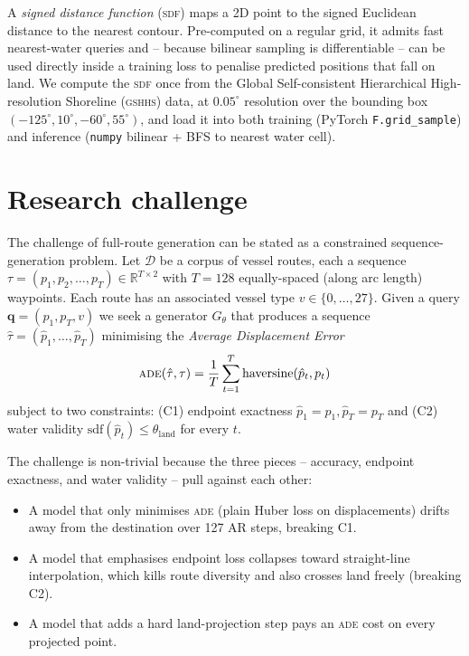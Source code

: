 \documentclass[11pt,a4paper]{article}
\newcommand{\ade}{\textsc{ade}}
\newcommand{\sdf}{\textsc{sdf}}
\newcommand{\code}[1]{\texttt{\small #1}}
\begin{document}
A \emph{signed distance function} (\sdf) maps a 2D point to the signed
Euclidean distance to the nearest contour.  Pre-computed on a regular
grid, it admits fast nearest-water queries and -- because bilinear
sampling is differentiable -- can be used directly inside a training
loss to penalise predicted positions that fall on land.  We compute the
\sdf{} once from the Global Self-consistent Hierarchical
High-resolution Shoreline (\textsc{gshhs}) data, at $0.05^\circ$
resolution over the bounding box $(-125^\circ, 10^\circ, -60^\circ,
55^\circ)$, and load it into both training (PyTorch
\code{F.grid\_sample}) and inference (\code{numpy} bilinear + BFS to
nearest water cell).

\section{Research challenge}\label{sec:challenge}

The challenge of full-route generation can be stated as a constrained
sequence-generation problem.  Let $\mathcal{D}$ be a corpus of vessel
routes, each a sequence
$\tau = (p_1, p_2, \ldots, p_T) \in \mathbb{R}^{T \times 2}$ with
$T = 128$ equally-spaced (along arc length) waypoints.  Each route has
an associated vessel type $v \in \{0, \ldots, 27\}$.
Given a query $\mathbf{q} = (p_1, p_T, v)$ we seek a generator
$G_\theta$ that produces a sequence
$\hat\tau = (\hat p_1, \ldots, \hat p_T)$ minimising the
\emph{Average Displacement Error}
\[
  \ade(\hat\tau, \tau)
    = \frac{1}{T} \sum_{t=1}^{T} \mathrm{haversine}(\hat p_t, p_t)
\]
subject to two constraints:
(C1) endpoint exactness $\hat p_1 = p_1, \hat p_T = p_T$ and
(C2) water validity $\mathrm{sdf}(\hat p_t) \leq \theta_{\mathrm{land}}$
     for every $t$.

The challenge is non-trivial because the three pieces -- accuracy,
endpoint exactness, and water validity -- pull against each other:

\begin{itemize}[leftmargin=*]
  \item A model that only minimises \ade{} (plain Huber loss on
        displacements) drifts away from the destination over 127 AR
        steps, breaking C1.
  \item A model that emphasises endpoint loss collapses toward
        straight-line interpolation, which kills route diversity and
        also crosses land freely (breaking C2).
  \item A model that adds a hard land-projection step pays an \ade{}
        cost on every projected point.
\end{itemize}
\end{document}

